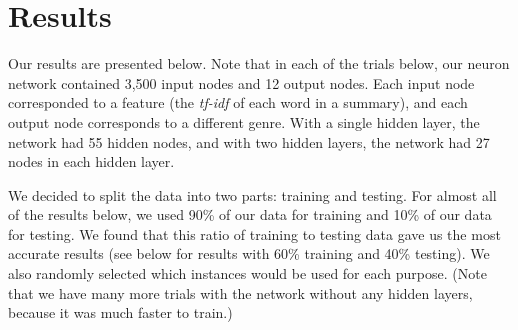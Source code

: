 \documentclass[11pt,letterpaper]{article}
\begin{document}
\section{Results}

Our results are presented below. Note that in each of the trials below, our neuron network contained 3,500 input nodes and 12 output nodes. Each input node corresponded to a feature (the \emph{tf-idf} of each word in a summary), and each output node corresponds to a different genre.  With a single hidden layer, the network had 55 hidden nodes, and with two hidden layers, the network had 27 nodes in each hidden layer.

We decided to split the data into two parts: training and testing. For almost all of the results below, we used 90\% of our data for training and 10\% of our data for testing. We found that this ratio of training to testing data gave us the most accurate results (see below for results with 60\% training and 40\% testing). We also randomly selected which instances would be used for each purpose. (Note that we have many more trials with the network without any hidden layers, because it was much faster to train.) \\
\end{document}
